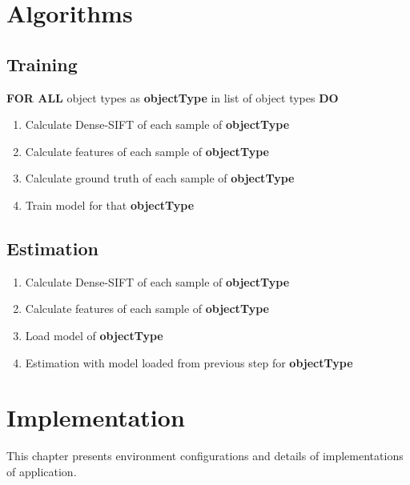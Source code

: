 \section{Algorithms}
\subsection{Training}
 \textbf{FOR ALL} object types as \textbf{objectType} in list of object types \textbf{DO}
        \begin{enumerate}
          \item  Calculate Dense-SIFT of each sample of \textbf{objectType} 
          \item  Calculate features of each sample of \textbf{objectType} 
          \item  Calculate ground truth of each sample of \textbf{objectType} 
          \item  Train model for that \textbf{objectType} 
        \end{enumerate}
 \subsection{Estimation}
        \begin{enumerate}
          \item  Calculate Dense-SIFT of each sample of \textbf{objectType} 
          \item  Calculate features of each sample of \textbf{objectType} 
          \item  Load model of \textbf{objectType} 
          \item  Estimation with model loaded from previous step for \textbf{objectType} 
        \end{enumerate}

\section{Implementation}
This chapter presents environment configurations and details of implementations of application. \\
